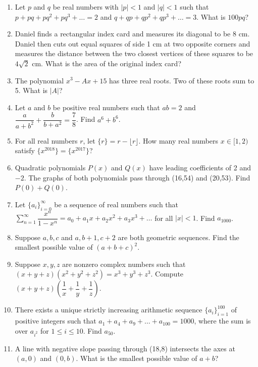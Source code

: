 \documentclass[12pt]{scrartcl}
\begin{document}
\begin{enumerate}
    \item Let $p$ and $q$ be real numbers with $|p|<1$ and $|q|<1$ such that $p+pq+pq^2+pq^3+\dots=2$ and $q+qp+qp^2+qp^3+\dots=3$. What is $100pq$?

    \item Daniel finds a rectangular index card and measures its diagonal to be 8 cm. Daniel then cuts out equal squares of side 1 cm at two opposite corners and measures the distance between the two closest vertices of these squares to be $4\sqrt{2}$ cm. What is the area of the original index card?

    \item The polynomial $x^3-Ax+15$ has three real roots. Two of these roots sum to 5. What is $|A|$?
    
    \item Let $a$ and $b$ be positive real numbers such that $ab=2$ and $\dfrac{a}{a+b^2} + \dfrac{b}{b+a^2} = \dfrac{7}{8}$. Find $a^6+b^6$.

    \item For all real numbers $r$, let $\{r\} = r - \lfloor r \rfloor$. How many real numbers $x \in [1,2)$ satisfy $\{x^{2018}\} = \{x^{2017}\}$?

    \item Quadratic polynomials $P(x)$ and $Q(x)$ have leading coefficients of 2 and $-2$. The graphs of both polynomials pass through (16,54) and (20,53). Find $P(0)+Q(0)$.

    \item Let $\{a_i\}_{i=0}^{\infty}$ be a sequence of real numbers such that $\sum_{n=1}^{\infty}\dfrac{x^n}{1-x^n} = a_0 + a_1x + a_2x^2 + a_3x^3 + \dots$ for all $|x|<1$. Find $a_{1000}$.

    \item Suppose $a, b, c$ and $a, b+1, c+2$ are both geometric sequences. Find the smallest possible value of $(a+b+c)^2$.

    \item Suppose $x, y, z$ are nonzero complex numbers such that $(x+y+z)(x^2+y^2+z^2) = x^3+y^3+z^3$. Compute $(x+y+z)(\dfrac{1}{x}+\dfrac{1}{y}+\dfrac{1}{z})$.

    \item There exists a unique strictly increasing arithmetic sequence $\{a_i\}_{i=1}^{100}$ of positive integers such that $a_1+a_4+a_9+\dots+a_{100}=1000$, where the sum is over $a_{i^2}$ for $1 \le i \le 10$. Find $a_{50}$.

    \item A line with negative slope passing through (18,8) intersects the axes at $(a,0)$ and $(0,b)$. What is the smallest possible value of $a+b$?


\end{enumerate}
\end{document}
